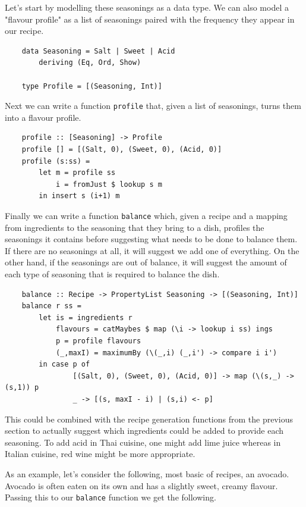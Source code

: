 \documentclass[11pt]{article}
\begin{document}
\medbreak

Let's start by modelling these seasonings as a data type. We can also model a
"flavour profile" as a list of seasonings paired with the frequency they appear
in our recipe.

\begin{lstlisting}
    data Seasoning = Salt | Sweet | Acid
        deriving (Eq, Ord, Show)

    type Profile = [(Seasoning, Int)]
\end{lstlisting}

Next we can write a function \texttt{profile} that, given a list of seasonings,
turns them into a flavour profile.

\begin{lstlisting}
    profile :: [Seasoning] -> Profile
    profile [] = [(Salt, 0), (Sweet, 0), (Acid, 0)]
    profile (s:ss) =
        let m = profile ss
            i = fromJust $ lookup s m
        in insert s (i+1) m
\end{lstlisting}

Finally we can write a function \texttt{balance} which, given a recipe and
a mapping from ingredients to the seasoning that they bring to a dish,
profiles the seasonings it contains before suggesting what needs to be done
to balance them. If there are no seasonings at all, it will suggest we add
one of everything. On the other hand, if the seasonings are out of balance,
it will suggest the amount of each type of seasoning that is required
to balance the dish.

\begin{lstlisting}
    balance :: Recipe -> PropertyList Seasoning -> [(Seasoning, Int)]
    balance r ss =
        let is = ingredients r
            flavours = catMaybes $ map (\i -> lookup i ss) ings
            p = profile flavours
            (_,maxI) = maximumBy (\(_,i) (_,i') -> compare i i')
        in case p of
                [(Salt, 0), (Sweet, 0), (Acid, 0)] -> map (\(s,_) -> (s,1)) p
                _ -> [(s, maxI - i) | (s,i) <- p]
\end{lstlisting}

This could be combined with the recipe generation functions from the previous
section to actually suggest which ingredients could be added to provide
each seasoning. To add acid in Thai cuisine, one might add lime juice whereas
in Italian cuisine, red wine might be more appropriate.

\medbreak

As an example, let's consider the following, most basic of recipes, an avocado.
Avocado is often eaten on its own and has a slightly sweet, creamy flavour.
Passing this to our \texttt{balance} function we get the following.
\end{document}
